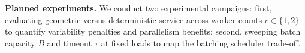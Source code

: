 \documentclass[conference]{IEEEtran}
\begin{document}
\textbf{Planned experiments.} We conduct two experimental campaigns: first, evaluating geometric versus deterministic service across worker counts $c \in \{1,2\}$ to quantify variability penalties and parallelism benefits; second, sweeping batch capacity $B$ and timeout $\tau$ at fixed loads to map the batching scheduler trade-off.



\end{document}
